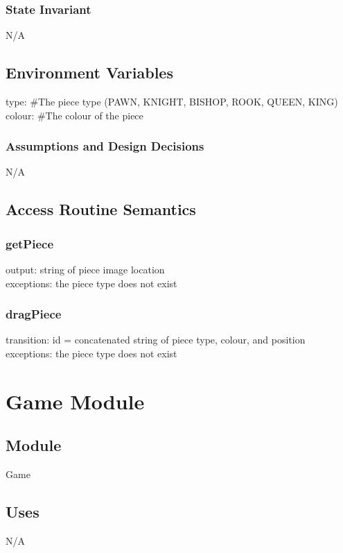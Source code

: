 \documentclass{article}
\begin{document}
        \subsubsection*{State Invariant}
            N/A
            
    \subsection*{Environment Variables}
        type: \#The piece type (PAWN, KNIGHT, BISHOP, ROOK, QUEEN, KING) \\
        colour: \#The colour of the piece

        \subsubsection*{Assumptions and Design Decisions}
            N/A
            
    \subsection*{Access Routine Semantics}
    
        \subsubsection*{getPiece}
            output: string of piece image location \\ 
            exceptions: the piece type does not exist
            
        \subsubsection*{dragPiece}
            transition: id = concatenated string of piece type, colour, and position \\
            exceptions: the piece type does not exist
            

\newpage
\section*{Game Module}
    \subsection*{Module}
        Game
    
    \subsection*{Uses}
        N/A
    
\end{document}
